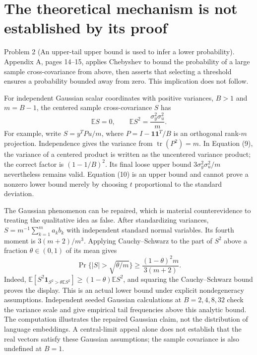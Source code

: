 \documentclass[10pt]{article}
\begin{document}
\section*{The theoretical mechanism is not established by its proof}
Problem 2 (An upper-tail upper bound is used to infer a lower probability).  Appendix A, pages 14–15, applies Chebyshev to bound the probability of a large sample cross-covariance from above, then asserts that selecting a threshold ensures a probability bounded away from zero. This implication does not follow.\par
For independent Gaussian scalar coordinates with positive variances, \(B>1\) and \(m=B-1\), the centered sample cross-covariance \(S\) has \[\mathbb E S=0,\qquad \mathbb E S^2=\frac{\sigma_y^2\sigma_u^2}{m}.\] For example, write \(S=y^TPu/m\), where \(P=I-\mathbf1\mathbf1^T/B\) is an orthogonal rank-\(m\) projection. Independence gives the variance from \(\operatorname{tr}(P^2)=m\). In Equation (9), the variance of a centered product is written as the uncentered variance product; the correct factor is \((1-1/B)^2\). Its final loose upper bound \(3\sigma_y^2\sigma_u^2/m\) nevertheless remains valid. Equation (10) is an upper bound and cannot prove a nonzero lower bound merely by choosing \(t\) proportional to the standard deviation.\par
The Gaussian phenomenon can be repaired, which is material counterevidence to treating the qualitative idea as false. After standardizing variances, \(S=m^{-1}\sum_{k=1}^m a_kb_k\) with independent standard normal variables. Its fourth moment is \(3(m+2)/m^3\). Applying Cauchy–Schwarz to the part of \(S^2\) above a fraction \(\theta\in(0,1)\) of its mean gives \[\Pr\{|S|>\sqrt{\theta/m}\}\geq
\frac{(1-\theta)^2m}{3(m+2)}.\] Indeed, \(\mathbb E[S^2\mathbf1_{S^2>\theta\mathbb ES^2}]\geq(1-\theta)\mathbb ES^2\), and squaring the Cauchy–Schwarz bound proves the display. This is an actual lower bound under explicit nondegeneracy assumptions. Independent seeded Gaussian calculations at \(B=2,4,8,32\) check the variance scale and give empirical tail frequencies above this analytic bound. The computation illustrates the repaired Gaussian claim, not the distribution of language embeddings. A central-limit appeal alone does not establish that the real vectors satisfy these Gaussian assumptions; the sample covariance is also undefined at \(B=1\).\par
\end{document}
